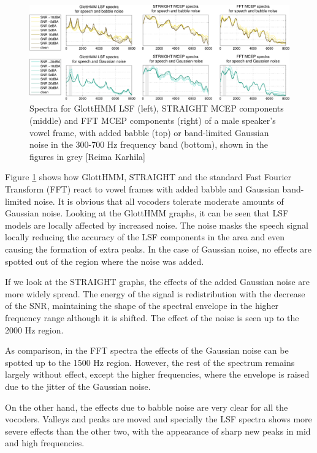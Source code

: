 \begin{figure}[!htb]
\begin{centering}
\includegraphics[width=\textwidth]{images/vowel_frame_and_noise_w_fft.pdf}
\caption{Spectra for GlottHMM LSF (left), STRAIGHT MCEP components (middle) and FFT MCEP components (right) of a male speaker's vowel frame, with added babble (top) or band-limited Gaussian noise in the 300-700 Hz frequency band (bottom), shown in the figures in grey [Reima Karhila]}
\label{fig:different_specs_noise}
\end{centering}
\end{figure}

Figure \ref{fig:different_specs_noise} shows how GlottHMM, STRAIGHT and the standard Fast Fourier Transform (FFT) react to vowel frames with added babble and Gaussian band-limited noise.
%
It is obvious that all vocoders tolerate moderate amounts of Gaussian noise.
%
Looking at the GlottHMM graphs, it can be seen that LSF models are locally affected by increased noise.
%
The noise masks the speech signal locally reducing the accuracy of the LSF components in the area and even causing the formation of extra peaks.
%
In the case of Gaussian noise, no effects are spotted out of the region where the noise was added. 

If we look at the STRAIGHT graphs, the effects of the added Gaussian noise are more widely spread.
%
The energy of the signal is redistribution with the decrease of the SNR, maintaining the shape of the spectral envelope in the higher frequency range although it is shifted.
%
The effect of the noise is seen up to the 2000 Hz region.
%

As comparison, in the FFT spectra the effects of the Gaussian noise can be spotted up to the 1500 Hz region.
%
However, the rest of the spectrum remains largely without effect, except the higher frequencies, where the envelope is raised due to the jitter of the Gaussian noise.

On the other hand, the effects due to babble noise are very clear for all the vocoders.
%
Valleys and peaks are moved and specially the LSF spectra shows more severe effects than the other two, with the appearance of sharp new peaks in mid and high frequencies.

